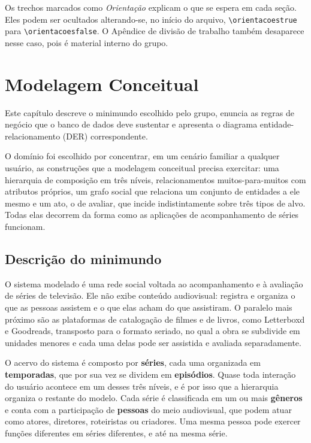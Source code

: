 \documentclass[a4paper,12pt,oneside,openany]{book}
\newif\iforientacoes
\begin{document}
Os trechos marcados como \textit{Orientação} explicam o que se espera em cada seção.
Eles podem ser ocultados alterando-se, no início do arquivo,
\verb|\orientacoestrue| para \verb|\orientacoesfalse|. O Apêndice de divisão de
trabalho também desaparece nesse caso, pois é material interno do grupo.

\clearpage
\fi

\chapter{Modelagem Conceitual}\label{cap:conceitual}

Este capítulo descreve o minimundo escolhido pelo grupo, enuncia as regras de
negócio que o banco de dados deve sustentar e apresenta o diagrama
entidade-relacionamento (DER) correspondente.

O domínio foi escolhido por concentrar, em um cenário familiar a qualquer usuário,
as construções que a modelagem conceitual precisa exercitar: uma hierarquia de
composição em três níveis, relacionamentos muitos-para-muitos com atributos
próprios, um grafo social que relaciona um conjunto de entidades a ele mesmo e um
ato, o de avaliar, que incide indistintamente sobre três tipos de alvo. Todas elas
decorrem da forma como as aplicações de acompanhamento de séries funcionam.

\section{Descrição do minimundo}

O sistema modelado é uma rede social voltada ao acompanhamento e à avaliação de
séries de televisão. Ele não exibe conteúdo audiovisual: registra e organiza o que
as pessoas assistem e o que elas acham do que assistiram. O paralelo mais próximo
são as plataformas de catalogação de filmes e de livros, como Letterboxd e Goodreads,
transposto para o formato seriado, no qual a obra se subdivide em unidades menores e
cada uma delas pode ser assistida e avaliada separadamente.

O acervo do sistema é composto por \textbf{séries}, cada uma organizada em
\textbf{temporadas}, que por sua vez se dividem em \textbf{episódios}. Quase toda
interação do usuário acontece em um desses três níveis, e é por isso que a
hierarquia organiza o restante do modelo. Cada série é classificada
em um ou mais \textbf{gêneros} e conta com a participação de \textbf{pessoas} do
meio audiovisual, que podem atuar como atores, diretores, roteiristas ou criadores.
Uma mesma pessoa pode exercer funções diferentes em séries diferentes, e até na
mesma série.
\end{document}
